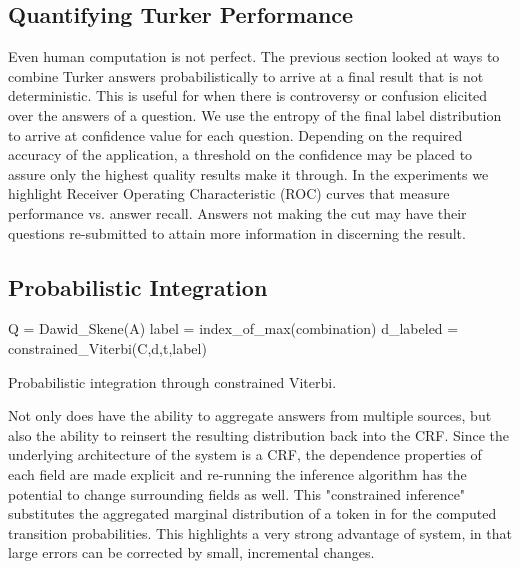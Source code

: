 \subsection{Quantifying Turker Performance}

Even human computation is not perfect.  The previous section looked at ways to combine Turker answers probabilistically to arrive at a final result that is not deterministic.  This is useful for when there is controversy or confusion elicited over the answers of a question.  We use the entropy of the final label distribution to arrive at confidence value for each question.  Depending on the required accuracy of the application, a threshold on the confidence may be placed to assure only the highest quality results make it through.  In the experiments we highlight Receiver Operating Characteristic (ROC) curves that measure performance vs. answer recall.  Answers not making the cut may have their questions re-submitted to attain more information in discerning the result. 

\subsection{Probabilistic Integration}

\begin{algorithm}[fillcomment]
\label{alg:integration}
\BlankLine
{}\;
Q = Dawid\_Skene(A)\;
\;
\;
label = index\_of\_max(combination)\;
d\_labeled = constrained\_Viterbi(C,d,t,label)\;

\caption{Probabilistic integration through constrained Viterbi.}
\end{algorithm}

Not only does \sysName have the ability to aggregate answers from multiple sources, but also the ability to reinsert the resulting distribution back into the CRF. Since the underlying architecture of the system is a CRF, the dependence properties of each field are made explicit and re-running the inference algorithm has the potential to change surrounding fields as well.  This "constrained inference" substitutes the aggregated marginal distribution of a token in for the computed transition probabilities.  This highlights a very strong advantage of \sysName system, in that large errors can be corrected by small, incremental changes.

